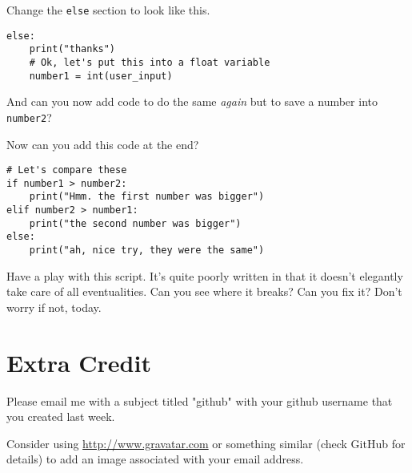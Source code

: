 \documentclass[12pt,oneside]{cttutorial}
\begin{document}
Change the \lstinline!else! section to look like this.
\begin{lstlisting}
else:
    print("thanks")
    # Ok, let's put this into a float variable
    number1 = int(user_input)
\end{lstlisting}

And can you now add code to do the same \emph{again} but to save a number into \lstinline!number2!?

Now can you add this code at the end?

\begin{lstlisting}
# Let's compare these
if number1 > number2:
    print("Hmm. the first number was bigger")
elif number2 > number1:
    print("the second number was bigger")
else:
    print("ah, nice try, they were the same")
\end{lstlisting}

Have a play with this script. It's quite poorly written in that it doesn't elegantly take care of all eventualities. Can you see where it breaks? Can you fix it? Don't worry if not, today.

\section{Extra Credit}

Please email me with a subject titled "github" with your github username that you created last week.

Consider using \url{http://www.gravatar.com} or something similar (check GitHub for details) to add an image associated with your email address.
\end{document}
